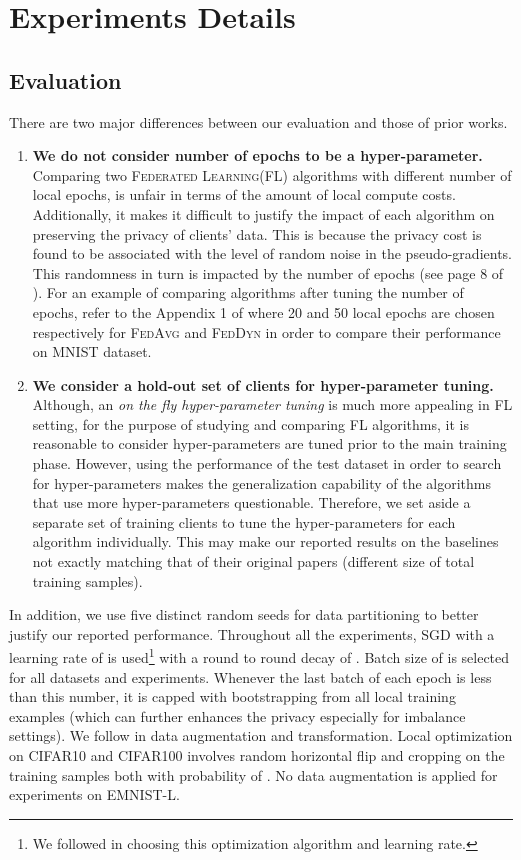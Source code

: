 \documentclass[runningheads]{llncs}
\newcommand{\fl}{\textsc{Federated Learning}\xspace}
\newcommand{\fedavg}{\textsc{FedAvg}\xspace}
\newcommand{\feddyn}{\textsc{FedDyn}\xspace}
\newcommand{\sgd}{\textsc{SGD}\xspace}
\def\cifart{{\textsc{CIFAR10}}}
\def\cifarh{{\textsc{CIFAR100}}}
\def\emnist{{\textsc{EMNIST-L}}}
\begin{document}
\section{Experiments Details}


\subsection{Evaluation}
There are two major differences between our evaluation and those of prior works. 
\begin{enumerate}
    \item \textbf{We do not consider number of epochs to be a hyper-parameter.}
    Comparing two \fl (FL) algorithms with different number of local epochs,
    is unfair in terms of the amount of local compute costs. 
Additionally, it makes it difficult to justify the impact of each algorithm on
    preserving the privacy of clients' data.
This is because the privacy cost is found to be associated with the level of random
    noise in the pseudo-gradients.
This randomness in turn is impacted by the number of epochs (see page 8 of
    \cite{fowl2021robbing}).
For an example of comparing algorithms after tuning the number of epochs, refer to
    the Appendix 1 of \cite{acar2021federated} where 20 and 50 local epochs are
    chosen respectively for \fedavg and \feddyn in order to compare their
    performance on \textsc{MNIST} dataset. 
    
    \item \textbf{We consider a hold-out set of clients for hyper-parameter tuning.}
Although, an {\it on the fly hyper-parameter tuning} is much more appealing in
    FL setting, for the purpose of studying and comparing FL
    algorithms, it is reasonable to consider hyper-parameters are tuned prior to the
    main training phase.
However, using the performance of the test dataset in order to search for
    hyper-parameters makes the generalization capability of the algorithms that use
    more hyper-parameters questionable.
Therefore, we set aside a separate set of training clients to tune the
    hyper-parameters for each algorithm individually.
This may make our reported results on the baselines not exactly matching that of
    their original papers (different size of total training samples).
\end{enumerate}
In addition, we use five distinct random seeds for data partitioning to better justify
our reported performance.
Throughout all the experiments, \sgd with a learning rate of  is
used\footnote{We followed \cite{acar2021federated} in choosing this optimization
algorithm and learning rate.} with a round to round decay of .
Batch size of  is selected for all datasets and experiments.
Whenever the last batch of each epoch is less than this number, it is capped with
bootstrapping from all local training examples (which can further enhances the privacy
especially for imbalance settings).
We follow \cite{acar2021federated} in data augmentation and transformation.
Local optimization on \cifart{} and \cifarh{} involves random horizontal
flip and cropping on the training samples both with probability of .
No data augmentation is applied for experiments on \emnist{}.
\end{document}
